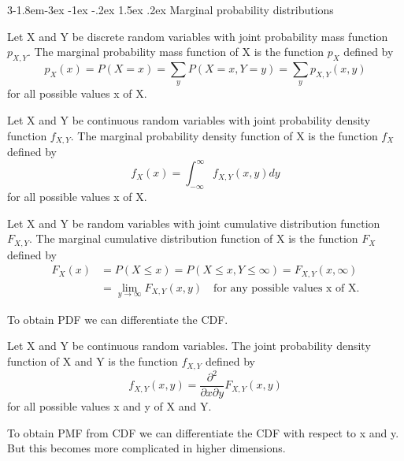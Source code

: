 \documentclass{tufte-handout}
\makeatletter
\renewcommand{\subsection}{\@startsection{subsection}%
    {3}{-1.8em}{-3ex \@plus -1ex \@minus -.2ex}%
    {1.5ex \@plus .2ex}
    {\hspace*{-5.5em}\fcolorbox{ltblue}{ltblue}{\parbox[c][1.0ex][b]{4em}{\phantom{space}}}
    \normalfont\large\itshape\color{ltblue}}}
\makeatother
\begin{document}
\subsection{Marginal probability distributions}
\begin{Definition}
    Let X and Y be discrete random variables with joint probability mass function $ p_{X,Y} $. The marginal probability mass function of X is the function $ p_X $ defined by
    \[p_X(x)=P(X=x)=\sum_y P(X=x,Y=y)=\sum_y p_{X,Y}(x,y)\]
    for all possible values x of X.
\end{Definition}

\begin{Definition}
    Let X and Y be continuous random variables with joint probability density function $ f_{X,Y} $. The marginal probability density function of X is the function $ f_X $ defined by
    \[f_X(x)=\int_{-\infty}^{\infty} f_{X,Y}(x,y) dy\]
    for all possible values x of X.
\end{Definition}

\begin{Definition}
    Let X and Y be random variables with joint cumulative distribution function $ F_{X,Y} $. The marginal cumulative distribution function of X is the function $ F_X $ defined by
    \begin{align*}
    F_X(x)&=P(X\leq x)=P(X\leq x, Y\leq \infty)=F_{X,Y}(x,\infty)\\
    &= \lim_{y \to \infty} F_{X,Y}(x,y) \quad \text{for any possible values x of X.}
    \end{align*}
\end{Definition}

To obtain PDF we can differentiate the CDF.
\begin{Definition}
    Let X and Y be continuous random variables. The joint probability density function of X and Y is the function
    $ f_{X,Y} $ defined by
    \[f_{X,Y}(x,y)=\frac{\partial^2}{\partial x \partial y} F_{X,Y}(x,y)\]
    for all possible values x and y of X and Y.
\end{Definition}

To obtain PMF from CDF we can differentiate the CDF with respect to x and y.
But this becomes more complicated in higher dimensions.
\end{document}
